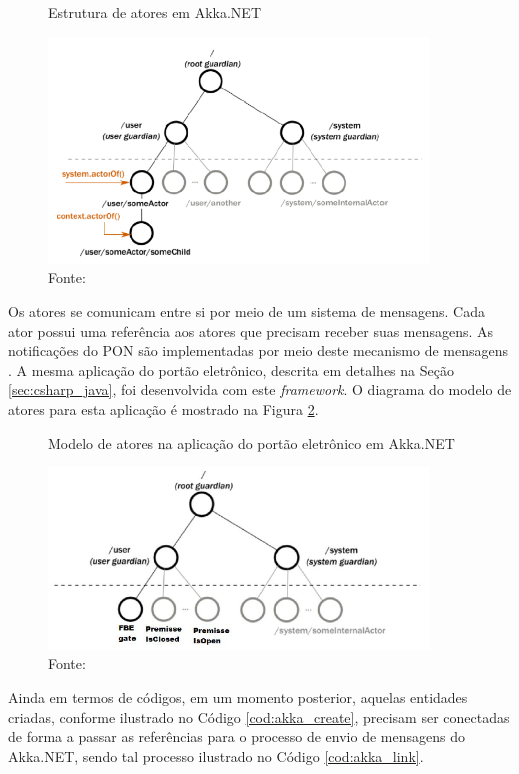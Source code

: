 \begin{figure}[!htb]
  \centering
  \caption{Estrutura de atores em Akka.NET}
  \includegraphics[width=0.9\textwidth]{../figures/atores_akka.png}
  \smallskip
  \caption*{Fonte: }
  \label{fig:akka_actor}
\end{figure}

Os atores se comunicam entre si por meio de um sistema de mensagens. Cada ator
possui uma referência aos atores que precisam receber suas mensagens. As
notificações do PON são implementadas por meio deste mecanismo de mensagens
\cite{martini_2019}. A mesma aplicação do portão eletrônico, descrita em
detalhes na Seção \ref{sec:csharp_java}, foi desenvolvida com este \textit{framework}.
O diagrama do modelo de atores para esta aplicação é mostrado na Figura
\ref{fig:akka_portao}.

\begin{figure}[!htb]
  \centering
  \caption{Modelo de atores na aplicação do portão eletrônico em Akka.NET}
  \includegraphics[width=0.9\textwidth]{../figures/akka_actor.png}
  \smallskip
  \caption*{Fonte: }
  \label{fig:akka_portao}
\end{figure}

Ainda em termos de códigos, em um momento posterior, aquelas entidades criadas,
conforme ilustrado no Código \ref{cod:akka_create}, precisam ser conectadas de
forma a passar as referências para o processo de envio de mensagens do Akka.NET,
sendo tal processo ilustrado no Código \ref{cod:akka_link}.

